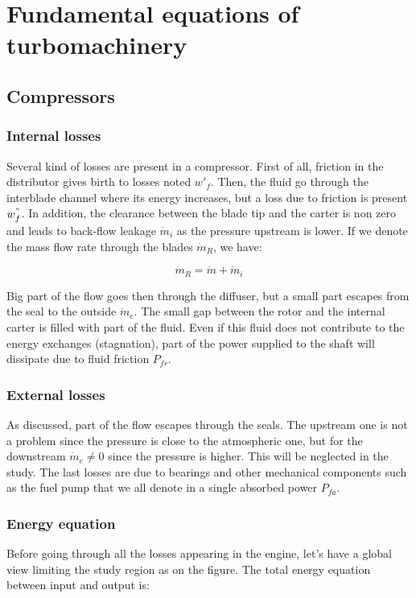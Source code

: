 \section{Fundamental equations of turbomachinery}
\subsection{Compressors}
\subsubsection{Internal losses}
Several kind of losses are present in a compressor. First of all, friction in the distributor gives birth to losses noted $w'_f$. Then, the fluid go through the interblade channel where its energy increases, but a loss due to friction is present $w^"_f$. In addition, the clearance between the blade tip and the carter is non zero and leads to back-flow leakage $\dot{m}_i$ as the pressure upstream is lower. If we denote the mass flow rate through the blades $\dot{m}_R$, we have: 

\begin{equation}
\dot{m}_R = \dot{m} + \dot{m}_i
\end{equation}

Big part of the flow goes then through the diffuser, but a small part escapes from the seal to the outside $\dot{m}_e$. The small gap between the rotor and the internal carter is filled with part of the fluid. Even if this fluid does not contribute to the energy exchanges (stagnation), part of the power supplied to the shaft will dissipate due to fluid friction $P_{fr}$. 

\subsubsection{External losses}
As discussed, part of the flow escapes through the seals. The upstream one is not a problem since the pressure is close to the atmospheric one, but for the downstream $\dot{m}_e \neq 0$ since the pressure is higher. This will be neglected in the study. The last losses are due to bearings and other mechanical components such as the fuel pump that we all denote in a single absorbed power $P_{fa}$. 

\subsubsection{Energy equation}
Before going through all the losses appearing in the engine, let's have a global view limiting the study region as on the figure. The total energy equation between input and output is: 

